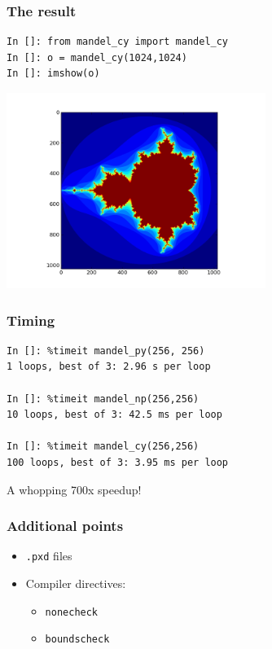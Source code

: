 \documentclass[14pt,compress]{beamer}
\newcounter{time}
\newcommand{\inctime}[1]{\addtocounter{time}{#1}{\tiny \thetime\ m}}
\newcommand{\typ}[1]{\lstinline{#1}}
\begin{document}
\begin{frame}
    \frametitle{The result}
\begin{lstlisting}
In []: from mandel_cy import mandel_cy
In []: o = mandel_cy(1024,1024)
In []: imshow(o)
\end{lstlisting}
\vspace*{-1em}
\begin{center}
    \includegraphics[height=2.5in]{data/mandelbrot}
\end{center}
\end{frame}

\begin{frame}[fragile]
    \frametitle{Timing}
    \begin{lstlisting}
In []: %timeit mandel_py(256, 256)
1 loops, best of 3: 2.96 s per loop

In []: %timeit mandel_np(256,256)
10 loops, best of 3: 42.5 ms per loop

In []: %timeit mandel_cy(256,256)
100 loops, best of 3: 3.95 ms per loop
    \end{lstlisting}
A whopping 700x speedup!
\end{frame}

\begin{frame}
    \frametitle{Additional points}
    \begin{itemize}
        \item \typ{.pxd} files
        \item Compiler directives:
            \begin{itemize}
                \item \typ{nonecheck}
                \item \typ{boundscheck}
            \end{itemize}
    \end{itemize}
    \inctime{10}
\end{frame}
\end{document}
